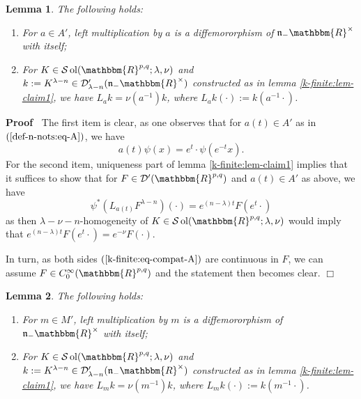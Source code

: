 \documentclass{article}
\newcommand{\assign}{:=}
\newcommand{\tmop}[1]{\ensuremath{\operatorname{#1}}}
\newenvironment{proof}{\noindent\textbf{Proof\ }}{\hspace*{\fill}$\Box$\medskip}
\newtheorem{lemma}{Lemma}
\begin{document}
\begin{lemma}
  \label{k-finite:lem-compat-A}The following holds:
  \begin{enumerate}
    \item For $a \in A'$, left multiplication by $a$ is a diffemororphism of
    $\mathfrak{n}_- \mathbbm{R}^{\times}$ with itself;
    
    \item For $K \in \mathcal{S} \tmop{ol} (\mathbbm{R}^{p, q} ; \lambda,
    \nu)$ and $k \assign K^{\lambda - n} \in \mathcal{D}'_{\lambda - n}
    (\mathfrak{n}_- \mathbbm{R}^{\times})$ constructed as in lemma
    \ref{k-finite:lem-claim1}, we have $L_a k = \nu (a^{- 1}) k$, where $L_a k
    (\cdot) \assign k (a^{- 1} \cdot)$.
  \end{enumerate}
\end{lemma}

\begin{proof}
  The first item is clear, as one observes that for $a (t) \in A'$ as in
  $(\ref{def-n-nots:eq-A})$, we have
  \[ a (t) \psi (x) = e^t \cdot \psi (e^{- t} x) . \]
  For the second item, uniqueness part of lemma \ref{k-finite:lem-claim1}
  implies that it suffices to show that for $F \in \mathcal{D}'
  (\mathbbm{R}^{p, q})$ and $a (t) \in A'$ as above, we have
  \begin{equation}
    \psi^{\ast} (L_{a (t)} F^{\lambda - n}) (\cdot) = e^{(n - \lambda) t} F
    (e^t \cdot) \label{k-finite:eq-compat-A}
  \end{equation}
  as then $\lambda - \nu - n$-homogeneity of $K \in \mathcal{S} \tmop{ol}
  (\mathbbm{R}^{p, q} ; \lambda, \nu)$ would imply that $e^{(n - \lambda) t} F
  (e^t \cdot) = e^{- \nu} F (\cdot)$.
  
  In turn, as both sides $(\ref{k-finite:eq-compat-A})$ are continuous in $F$,
  we can assume $F \in C^{\infty}_0 (\mathbbm{R}^{p, q})$ and the statement
  then becomes clear.
\end{proof}

\begin{lemma}
  \label{k-finite:lem-compat-M}The following holds:
  \begin{enumerate}
    \item For $m \in M'$, left multiplication by $m$ is a diffemororphism of
    $\mathfrak{n}_- \mathbbm{R}^{\times}$ with itself;
    
    \item For $K \in \mathcal{S} \tmop{ol} (\mathbbm{R}^{p, q} ; \lambda,
    \nu)$ and $k \assign K^{\lambda - n} \in \mathcal{D}'_{\lambda - n}
    (\mathfrak{n}_- \mathbbm{R}^{\times})$ constructed as in lemma
    \ref{k-finite:lem-claim1}, we have $L_m k = \nu (m^{- 1}) k$, where $L_m k
    (\cdot) \assign k (m^{- 1} \cdot)$.
  \end{enumerate}
\end{lemma}
\end{document}
